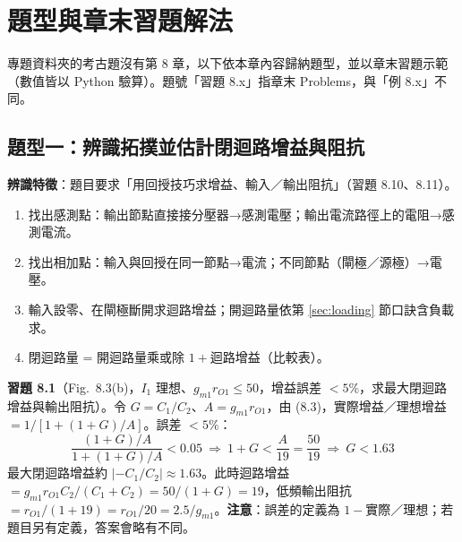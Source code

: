 \documentclass[11pt,a4paper]{article}
\begin{document}
\section{題型與章末習題解法}\label{sec:problems}

專題資料夾的考古題沒有第 8 章，以下依本章內容歸納題型，並以章末習題示範（數值皆以 Python 驗算）。題號「習題 8.x」指章末 Problems，與「例 8.x」不同。

\subsection{題型一：辨識拓撲並估計閉迴路增益與阻抗}
\textbf{辨識特徵}：題目要求「用回授技巧求增益、輸入／輸出阻抗」（習題 8.10、8.11）。
\begin{enumerate}
  \item 找出感測點：輸出節點直接接分壓器→感測電壓；輸出電流路徑上的電阻→感測電流。
  \item 找出相加點：輸入與回授在同一節點→電流；不同節點（閘極／源極）→電壓。
  \item 輸入設零、在閘極斷開求迴路增益；開迴路量依第 \ref{sec:loading} 節口訣含負載求。
  \item 閉迴路量 = 開迴路量乘或除 $1+$迴路增益（比較表）。
\end{enumerate}

\textbf{習題 8.1}（Fig.~8.3(b)，$I_1$ 理想、$g_{m1}r_{O1}\le50$，增益誤差 $<5\%$，求最大閉迴路增益與輸出阻抗）。令 $G=C_1/C_2$、$A=g_{m1}r_{O1}$，由 (8.3)，實際增益／理想增益 $=1/[1+(1+G)/A]$。誤差 $<5\%$：
\[
  \frac{(1+G)/A}{1+(1+G)/A}<0.05\ \Rightarrow\ 1+G<\frac{A}{19}=\frac{50}{19}\ \Rightarrow\ G<1.63
\]
最大閉迴路增益約 $|{-C_1/C_2}|\approx1.63$。此時迴路增益 $=g_{m1}r_{O1}C_2/(C_1+C_2)=50/(1+G)=19$，低頻輸出阻抗 $=r_{O1}/(1+19)=r_{O1}/20=2.5/g_{m1}$。\textbf{注意}：誤差的定義為 $1-$實際／理想；若題目另有定義，答案會略有不同。
\end{document}
